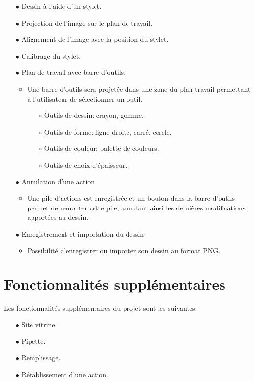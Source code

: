\documentclass[11pt,a4paper,oldfontcommands]{memoir}
\begin{document}
\begin{itemize}
\item[$\bullet$] Dessin à l’aide d’un stylet.
\item[$\bullet$] Projection de l’image sur le plan de travail.
\item[$\bullet$] Alignement de l’image avec la position du stylet.
\item[$\bullet$] Calibrage du stylet.
\item[$\bullet$] Plan de travail avec barre d'outils.
    \begin{itemize}
	\item Une barre d'outils sera projetée dans une zone du plan travail permettant à l'utilisateur de sélectionner un outil.
	\begin{itemize}
    \item[$\circ$] Outils de dessin: crayon, gomme.
	\item[$\circ$] Outils de forme: ligne droite, carré, cercle.
	\item[$\circ$] Outils de couleur: palette de couleurs.
	\item[$\circ$] Outils de choix d'épaisseur.
	\end{itemize}
    \end{itemize}
\item[$\bullet$] Annulation d’une action
    \begin{itemize}
	\item Une pile d'actions est enregistrée et un bouton dans la barre d'outils permet de remonter cette pile, annulant ainsi les dernières modifications apportées au dessin.
	\end{itemize}
\item[$\bullet$] Enregistrement et importation du dessin
	\begin{itemize}
	\item Possibilité d'enregistrer ou importer son dessin au format PNG.
	\end{itemize}
\end{itemize}

\section{Fonctionnalités supplémentaires}

Les fonctionnalités supplémentaires du projet sont les suivantes:

\begin{itemize}
\item[$\bullet$] Site vitrine.
\item[$\bullet$] Pipette.
\item[$\bullet$] Remplissage.
\item[$\bullet$] Rétablissement d'une action.
\end{itemize}
\end{document}
